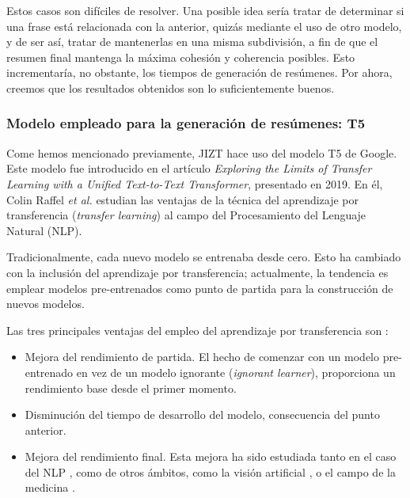 Estos casos son difíciles de resolver. Una posible idea sería tratar de determinar si una frase está relacionada con la anterior, quizás mediante el uso de otro modelo, y de ser así, tratar de mantenerlas en una misma subdivisión, a fin de que el resumen final mantenga la máxima cohesión y coherencia posibles. Esto incrementaría, no obstante, los tiempos de generación de resúmenes. Por ahora, creemos que los resultados obtenidos son lo suficientemente buenos.

\bigskip
\subsubsection{Modelo empleado para la generación de resúmenes: T5}

Come hemos mencionado previamente, JIZT hace uso del modelo T5 \cite{raffel19} de Google. Este modelo fue introducido en el artículo \emph{Exploring the Limits of Transfer Learning with a Unified Text-to-Text Transformer}, presentado en 2019. En él, Colin Raffel \emph{et al.} estudian las ventajas de la técnica del aprendizaje por transferencia (\emph{transfer learning}) al campo del Procesamiento del Lenguaje Natural (NLP).

Tradicionalmente, cada nuevo modelo se entrenaba desde cero. Esto ha cambiado con la inclusión del aprendizaje por transferencia; actualmente, la tendencia es emplear modelos pre-entrenados como punto de partida para la construcción de nuevos modelos.

Las tres principales ventajas del empleo del aprendizaje por transferencia son \cite{sarkar18}:

\vspace*{-\baselineskip}
\begin{itemize}
	\item [\textbullet] Mejora del rendimiento de partida. El hecho de comenzar con un modelo pre-entrenado en vez de un modelo ignorante (\emph{ignorant learner}), proporciona un rendimiento base desde el primer momento.
	
	\item [\textbullet] Disminución del tiempo de desarrollo del modelo, consecuencia del punto anterior.
	
	\item [\textbullet] Mejora del rendimiento final. Esta mejora ha sido estudiada tanto en el caso del NLP \cite{kumar21}, como de otros ámbitos, como la visión artificial \cite{ali21}, o el campo de la medicina \cite{liu21}.
\end{itemize}


